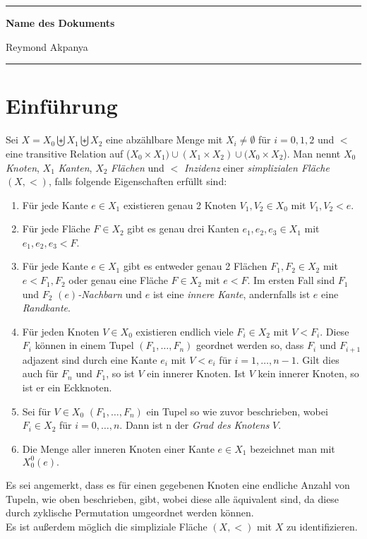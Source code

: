 \documentclass[12pt,titlepage]{article}
\begin{document}
\thispagestyle{empty}
\noindent\rule{\textwidth}{0.5pt}
\centerline{\textbf{\large{Name des Dokuments}}}
\centerline{Reymond Akpanya}
\noindent\rule{\textwidth}{0.5pt}
\newline
\section*{Einführung}
\begin{definition}  \label{defss} Sei $X=X_{0} \biguplus X_{1} \biguplus X_{2}$ eine abzählbare Menge mit $X_{i} \ne \emptyset$ für $i=0,1,2$ und $<$ eine transitive Relation auf  ($X_{0}\times X_{1}) \cup (X_{1}\times X_{2})\cup (X_{0}\times X_{2}$). Man nennt $X_{0}$ \emph{Knoten}, $X_{1}$ \emph{Kanten}, $X_{2}$ \emph{Flächen} und $<$ \emph{Inzidenz} einer \emph{simplizialen Fläche} $(X,<)$, falls folgende Eigenschaften erfüllt sind:
 \begin{enumerate}
\item Für jede Kante $e \in X_{1}$ existieren genau 2 Knoten $V_1,V_2 \in X_{0}$ mit $V_1,V_2 < e$. 
\item Für jede Fläche $F\in X_2$ gibt es genau drei Kanten $e_1,e_2,e_3 \in X_{1}$ mit $e_1,e_2,e_3 < F$. 
\item Für jede Kante $e \in X_{1}$ gibt es entweder genau 2 Flächen $F_{1},F_{2} \in X_{2}$ mit $e <F_{1},F_2$ oder
genau eine Fläche $F \in X_{2}$ mit $e < F$. Im ersten Fall sind $F_{1}$ und $F_{2}$ \emph{$(e)$-Nachbarn} und $e$ ist eine \emph{innere Kante}, andernfalls ist $e$ eine \emph{Randkante}. 
\item Für jeden Knoten $V \in X_{0}$ existieren endlich viele $F_{i}\in X_{2}$ mit $V < F_{i}$. Diese $F_{i}$ können in einem Tupel $(F_{1},\ldots,F_{n})$ geordnet werden so, dass $F_{i}$ und $F_{i+1}$ adjazent sind durch eine Kante $e_{i}$ mit $V <e_{i}$ für $i=1, \ldots, n-1$. Gilt dies auch für $F_{n}$ und $F_{1}$, so ist $V$ ein innerer Knoten. Ist $V$ kein innerer Knoten, so ist er 
 ein Eckknoten. 
 \item Sei für $V \in X_0$ $(F_1,\ldots,F_n)$ ein Tupel so wie zuvor beschrieben, wobei $F_i \in X_2$ für $i=0,\ldots,n$. Dann ist n der \emph{Grad des Knotens} $V$.
 \item Die Menge aller inneren Knoten einer Kante $e \in X_1$ bezeichnet man mit $X_0^0(e).$
\end{enumerate}
\end{definition}
Es sei angemerkt, dass es für einen gegebenen Knoten eine endliche Anzahl von Tupeln, wie oben beschrieben, gibt, wobei diese alle äquivalent sind, da diese durch zyklische Permutation umgeordnet werden können.\\ Es ist außerdem möglich die simpliziale Fläche $(X,<)$ mit $X$ zu identifizieren.
\end{document}

